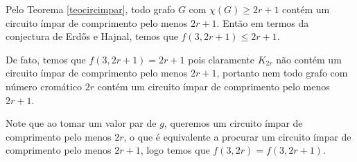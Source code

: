 Pelo Teorema \ref{teocircimpar}, todo grafo $G$ com $\chi(G) \geq 2r+1$ contém um circuito ímpar de comprimento pelo menos $2r+1$. Então em termos da conjectura de Erd\H{o}s e Hajnal, temos que $f(3,2r+1) \leq 2r+1$.

De fato, temos que $f(3,2r+1) = 2r+1$ pois claramente $K_{2r}$ não contém um circuito ímpar de comprimento pelo menos $2r+1$, portanto nem todo grafo com número cromático $2r$ contém um circuito ímpar de comprimento pelo menos $2r+1$.

Note que ao tomar um valor par de $g$, queremos um circuito ímpar de comprimento pelo menos $2r$, o que é equivalente a procurar um circuito ímpar de comprimento pelo menos $2r+1$, logo temos que $f(3,2r) = f(3,2r+1)$.